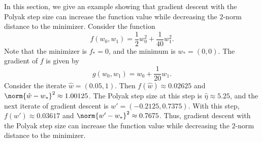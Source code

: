 \documentclass[10pt]{article} %
\begin{document}
In this section, we give an example showing that gradient descent with the Polyak step size can increase the function value while decreasing the $2$-norm distance to the minimizer. Consider the function
\begin{equation*}
    f(w_0, w_1) = \frac{1}{2}w_0^2 + \frac{1}{40}w_1^2.
\end{equation*}
Note that the minimizer is $f_{*} = 0$, and the minimum is $w_{*} = (0,0)$. The gradient of $f$ is given by
\begin{equation*}
    g(w_0, w_1) = w_0 + \frac{1}{20}w_1.
\end{equation*}
Consider the iterate $\hat{w} = (0.05, 1)$. Then $f(\hat{w}) \approx 0.02625$ and $\norm{\hat{w} - w_{*}}^2 \approx 1.00125$. The Polyak step size at this step is $\hat{\eta} \approx 5.25$, and the next iterate of gradient descent is $w' = (-0.2125, 0.7375)$. With this step, $f(w') \approx 0.03617$ and $\norm{w' - w_{*}}^2 \approx 0.7675$. Thus, gradient descent with the Polyak step size can increase the function value while decreasing the $2$-norm distance to the minimizer.
\end{document}

